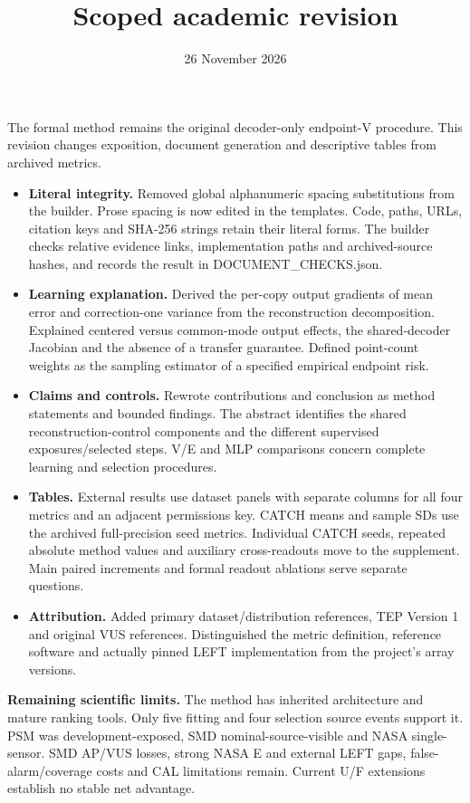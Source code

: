 \documentclass[
  10pt,
]{article}
\title{Scoped academic revision}
\author{}
\date{26 November 2026}
\providecommand{\tightlist}{%
  \setlength{\itemsep}{0pt}\setlength{\parskip}{0pt}}
\begin{document}
\maketitle

The formal method remains the original decoder-only endpoint-V
procedure. This revision changes exposition, document generation and
descriptive tables from archived metrics.

\begin{itemize}
\tightlist
\item
  \textbf{Literal integrity.} Removed global alphanumeric spacing
  substitutions from the builder. Prose spacing is now edited in the
  templates. Code, paths, URLs, citation keys and SHA-256 strings retain
  their literal forms. The builder checks relative evidence links,
  implementation paths and archived-source hashes, and records the
  result in DOCUMENT\_CHECKS.json.
\item
  \textbf{Learning explanation.} Derived the per-copy output gradients
  of mean error and correction-one variance from the reconstruction
  decomposition. Explained centered versus common-mode output effects,
  the shared-decoder Jacobian and the absence of a transfer guarantee.
  Defined point-count weights as the sampling estimator of a specified
  empirical endpoint risk.
\item
  \textbf{Claims and controls.} Rewrote contributions and conclusion as
  method statements and bounded findings. The abstract identifies the
  shared reconstruction-control components and the different supervised
  exposures/selected steps. V/E and MLP comparisons concern complete
  learning and selection procedures.
\item
  \textbf{Tables.} External results use dataset panels with separate
  columns for all four metrics and an adjacent permissions key. CATCH
  means and sample SDs use the archived full-precision seed metrics.
  Individual CATCH seeds, repeated absolute method values and auxiliary
  cross-readouts move to the supplement. Main paired increments and
  formal readout ablations serve separate questions.
\item
  \textbf{Attribution.} Added primary dataset/distribution references,
  TEP Version 1 and original VUS references. Distinguished the metric
  definition, reference software and actually pinned LEFT implementation
  from the project's array versions.
\end{itemize}

\textbf{Remaining scientific limits.} The method has inherited
architecture and mature ranking tools. Only five fitting and four
selection source events support it. PSM was development-exposed, SMD
nominal-source-visible and NASA single-sensor. SMD AP/VUS losses, strong
NASA E and external LEFT gaps, false-alarm/coverage costs and CAL
limitations remain. Current U/F extensions establish no stable net
advantage.
\end{document}
